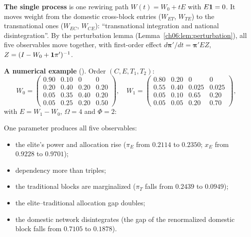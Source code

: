 \documentclass[../solutions_manual.tex]{subfiles}
\begin{document}
\textbf{The single process} is one rewiring path $W(t) = W_0 + tE$ with $E\mathbf{1} = 0$. It moves weight from the domestic cross-block entries ($W_{ET}$, $W_{TE}$) to the transnational ones ($W_{EC}$, $W_{CE}$): ``transnational integration and national disintegration''. By the perturbation lemma (Lemma~\ref{ch06:lem:perturbation}), all five observables move together, with first-order effect $d\boldsymbol\pi'/dt = \boldsymbol\pi'EZ$, $Z = (I - W_0 + \mathbf{1}\pi')^{-1}$.

\textbf{A numerical example} (\illustrative). Order $(C, E, T_1, T_2)$:
\[
W_0 = \begin{pmatrix} 0.90 & 0.10 & 0 & 0\\ 0.20 & 0.40 & 0.20 & 0.20\\ 0.05 & 0.35 & 0.40 & 0.20\\ 0.05 & 0.25 & 0.20 & 0.50\end{pmatrix}\!,\quad
W_1 = \begin{pmatrix} 0.80 & 0.20 & 0 & 0\\ 0.55 & 0.40 & 0.025 & 0.025\\ 0.05 & 0.10 & 0.65 & 0.20\\ 0.05 & 0.05 & 0.20 & 0.70\end{pmatrix}\!,
\]
with $E = W_1 - W_0$, $\Omega = 4$ and $\Phi = 2$:
\begin{center}
\small
{}
\end{center}
One parameter produces all five observables:
\begin{itemize}
\item the elite's power and allocation rise ($\pi_E$ from $0.2114$ to $0.2350$; $x_E$ from $0.9228$ to $0.9701$);
\item dependency more than triples;
\item the traditional blocks are marginalized ($\pi_T$ falls from $0.2439$ to $0.0949$);
\item the elite--traditional allocation gap doubles;
\item the domestic network disintegrates (the gap of the renormalized domestic block falls from $0.7105$ to $0.1878$).
\end{itemize}
\end{document}
